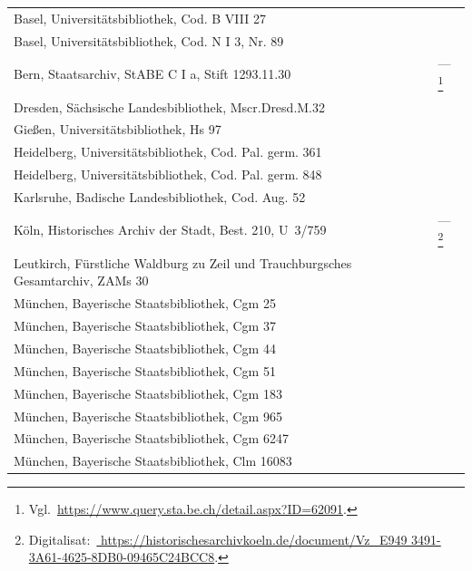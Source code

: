 \noindent
\begin{tabularx}{\linewidth}{@{} >{\raggedright\arraybackslash}X l @{}}
Basel, Universitätsbibliothek, Cod. B VIII 27
	& \autocite[2776]{hsc} \\
Basel, Universitätsbibliothek, Cod. N I 3, Nr. 89
	& \autocite[1158]{hsc} \\
Bern, Staatsarchiv, StABE C I a, Stift 1293.11.30
	& ---%
	\footnote{Vgl.~\url{https://www.query.sta.be.ch/detail.aspx?ID=62091}.}
	\\
Dresden, Sächsische Landesbibliothek, Mscr.Dresd.M.32
	& \autocite[7549]{hsc} \\
Gießen, Universitätsbibliothek, Hs 97
	& \autocite[1102]{hsc} \\
Heidelberg, Universitätsbibliothek, Cod. Pal. germ. 361
	& \autocite[1181]{hsc} \\
Heidelberg, Universitätsbibliothek, Cod. Pal. germ. 848
	& \autocite[4957]{hsc} \\
Karlsruhe, Badische Landesbibliothek, Cod. Aug. 52
	& \autocite[8470]{hsc} \\
Köln, Historisches Archiv der Stadt, Best. 210, U~3/759
	& ---%
	\footnote{Digitalisat:~\href{%
		https://historischesarchivkoeln.de/document/Vz_E9493491-3A61-4625-8DB0-09465C24BCC8%
	}{%
		https://historischesarchivkoeln.de/document/Vz\_E949\allowbreak{}%
		3491-3A61-4625-8DB0-0946\allowbreak{}5C24\allowbreak{}BCC8}.%
	}\\
Leutkirch, Fürstliche Waldburg zu Zeil und Trauch\-burg\-sches
	Gesamt\-archiv, ZAMs 30
	& \autocite[8471]{hsc} \\
München, Bayerische Staatsbibliothek, Cgm 25
	& \autocite[8827]{hsc} \\
München, Bayerische Staatsbibliothek, Cgm 37
	& \autocite[2119]{hsc} \\
München, Bayerische Staatsbibliothek, Cgm 44
	& \autocite[1307]{hsc} \\
München, Bayerische Staatsbibliothek, Cgm 51
	& \autocite[1286]{hsc} \\
München, Bayerische Staatsbibliothek, Cgm 183
	& \autocite[9715]{hsc} \\
München, Bayerische Staatsbibliothek, Cgm 965
	& \autocite[8472]{hsc} \\
München, Bayerische Staatsbibliothek, Cgm 6247
	& \autocite[1450]{hsc} \\
München, Bayerische Staatsbibliothek, Clm 16083
	& \autocite[19293]{hsc} \\
\end{tabularx}

